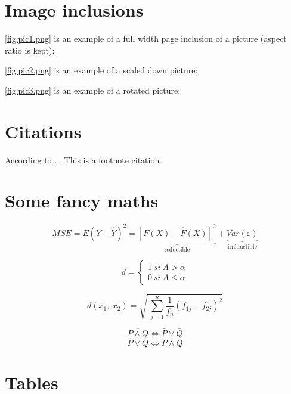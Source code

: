 \lipsum[1-2]

\section{Image inclusions}

\ref{fig:pic1.png} is an example of a full width page inclusion
of a picture (aspect ratio is kept):


\ref{fig:pic2.png} is an example of a scaled down picture:


\ref{fig:pic3.png} is an example of a rotated picture:


\section{Citations}

According to \cite{inbook-full}...
This is a footnote citation.

\section{Some fancy maths}

\[\textit{MSE}=E(Y-\hat{Y})^2=\underbrace{\left[F(X)-\hat{F}(X)\right]^2}_{\text{reductible}} + \underbrace{\textit{Var}(\varepsilon)}_{\text{irréductible}}\]

\[d=\left\{
        \begin{array}{l}
        1\ si\ A>\alpha \\
        0\ si\ A\leqslant\alpha
        \end{array}
        \right.
      \]

\[d(x_1,\ x_2)=\sqrt{\ \sum_{j=1}^n\frac{1}{f_n}(f_{1j}-f_{2j})^2}\]

\begin{theo}
\[\overline{P \wedge Q} \Leftrightarrow \bar{P} \vee \bar{Q}\]
\[\overline{P \vee Q} \Leftrightarrow \bar{P} \wedge \bar{Q}\]
\end{theo}

\section{Tables}

